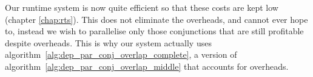 
Our runtime system is now quite efficient so that these
costs are kept low (chapter \ref{chap:rts}).
This does not eliminate the overheads, and cannot ever hope to,
instead we wish to parallelise only those conjunctions that are still
profitable despite overheads.
This is why our system actually uses
algorithm~\ref{alg:dep_par_conj_overlap_complete},
a version of algorithm~\ref{alg:dep_par_conj_overlap_middle}
that accounts for overheads.

